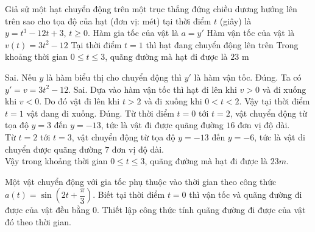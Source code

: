 \begin{ex}%
Giả sử một hạt chuyển động trên một trục thẳng đứng chiều dương hướng lên trên sao cho tọa độ của hạt (đơn vị: mét) tại thời điểm $t$ (giây) là $y=t^3-12t+3$, $t\geq0$.
\choiceTF
{Hàm gia tốc của vật là $a=y'$}
{\True Hàm vận tốc của vật là $v(t)=3t^2-12$}
{Tại thời điểm $t=1$ thì hạt đang chuyển động lên trên}
{\True Trong khoảng thời gian $0\leq t \leq 3$, quãng đường mà hạt đi được là $23$ m}
\loigiai
{
\begin{itemchoice}
\itemch Sai. Nếu $y$ là hàm biểu thị cho chuyển động thì $y'$ là hàm vận tốc.
\itemch Đúng. Ta có $y'=v=3t^2-12$.
\itemch Sai. Dựa vào hàm vận tốc thì hạt đi lên khi $v>0$ và đi xuống khi $v<0$. Do đó vật đi lên khi $t>2$ và đi xuống khi $0<t<2$. Vậy tại thời điểm $t=1$ vật đang đi xuống.
\itemch Đúng. Từ thời điểm $t=0$ tới $t=2$, vật chuyển động từ tọa độ $y=3$ đến $y=-13$, tức là vật đi được quãng đường $16$ đơn vị độ dài. \\
Từ $t=2$ tới $t=3$, vật chuyển động từ tọa độ $y=-13$ đến $y=-6$, tức là vật di chuyển được quãng đường $7$ đơn vị độ dài. \\
Vậy trong khoảng thời gian $0\leq t \leq 3$, quãng đường mà hạt đi được là $23m$.
\end{itemchoice}
}
\end{ex}

\begin{bt}%
	Một vật chuyển động với gia tốc phụ thuộc vào thời gian theo công thức $a(t)=\sin \left(2t+\dfrac{\pi}{3}\right)$. Biết tại thời điểm $t=0$ thì vận tốc và quãng đường đi được của vật đều bằng $0$. Thiết lập công thức tính quãng đường đi được của vật đó  theo thời gian.
\end{bt}

